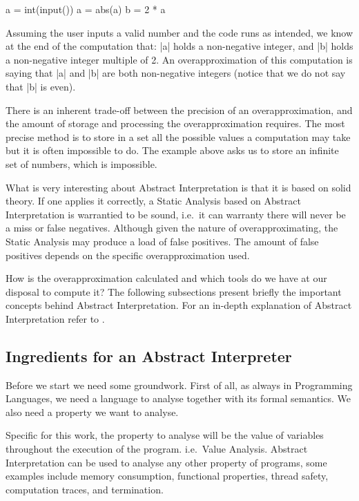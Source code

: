 \begin{pythoncode}
a = int(input())
a = abs(a)
b = 2 * a
\end{pythoncode}

Assuming the user inputs a valid number and the code runs as intended,
we know at the end of the computation that: \pycode|a| holds a
non-negative integer, and \pycode|b| holds a non-negative integer
multiple of 2. An overapproximation of this computation is saying that
\pycode|a| and \pycode|b| are both non-negative integers (notice that we
do not say that \pycode|b| is even).

There is an inherent trade-off between the precision of an
overapproximation, and the amount of storage and processing the
overapproximation requires. The most precise method is to store in a set
all the possible values a computation may take but it is often
impossible to do. The example above asks us to store an infinite set of
numbers, which is impossible.

What is very interesting about Abstract Interpretation is that it is
based on solid theory. If one applies it correctly, a Static Analysis
based on Abstract Interpretation is warrantied to be sound, i.e.~it can
warranty there will never be a miss or false negatives. Although given
the nature of overapproximating, the Static Analysis may produce a load
of false positives. The amount of false positives depends on the
specific overapproximation used.

How is the overapproximation calculated and which tools do we have at
our disposal to compute it? The following subsections present briefly
the important concepts behind Abstract Interpretation. For an in-depth
explanation of Abstract Interpretation refer to
\autocites[Chapters 1 and 4]{nielson2015principles}%
{cousot_abstract_1977}%
{nipkow_abstract_2014}.

\subsection{Ingredients for an Abstract Interpreter}
\label{ingredients-for-an-abstract-interpreter}

Before we start we need some groundwork. First of all, as always in
Programming Languages, we need a language to analyse together with its
formal semantics. We also need a property we want to analyse.

Specific for this work, the property to analyse will be the value of
variables throughout the execution of the program. i.e.~Value Analysis.
Abstract Interpretation can be used to analyse any other property of
programs, some examples include memory consumption, functional
properties, thread safety, computation traces, and termination.


